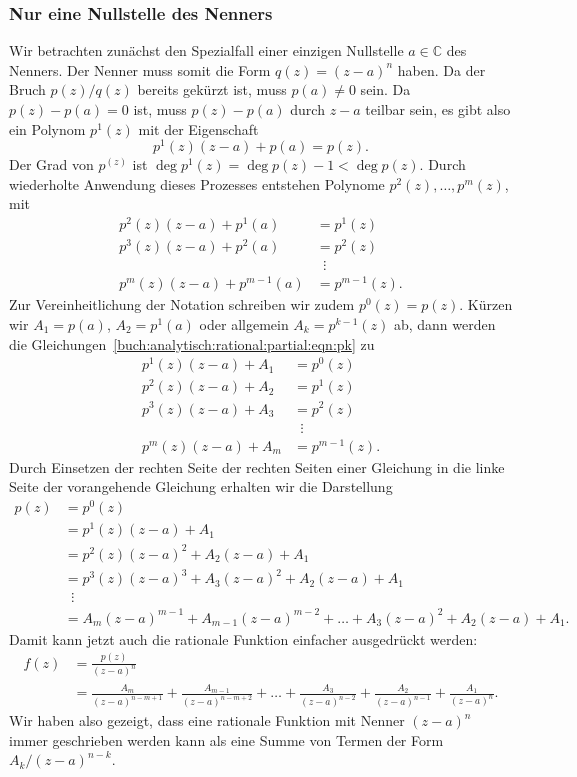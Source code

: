 %
%
\subsubsection{Nur eine Nullstelle des Nenners}
Wir betrachten zunächst den Spezialfall einer einzigen Nullstelle
$ a\in\mathbb{C}$ des Nenners.
Der Nenner muss somit die Form $q(z) = (z- a)^n$ haben.
Da der Bruch $p(z)/q(z)$ bereits gekürzt ist, muss $p( a)\ne 0$
sein.
Da $p(z)-p( a)=0$ ist, muss $p(z)-p( a)$ durch $z- a$
teilbar sein, es gibt also ein Polynom $p^1(z)$ mit der Eigenschaft
\[
p^1(z)(z- a) + p( a) = p(z).
\]
Der Grad von $p^(z)$ ist $\deg p^1(z) = \deg p(z)-1 < \deg p(z)$.
Durch wiederholte Anwendung dieses Prozesses entstehen Polynome
$p^2(z),\dots,p^m(z)$, mit 
\begin{equation}
\begin{aligned}
p^2(z)(z- a) + p^1( a)     &= p^1(z)           \\
p^3(z)(z- a) + p^2( a)     &= p^2(z)           \\[-2pt]
                                   &\phantom{a} \vdots \\
p^m(z)(z- a) + p^{m-1}( a) &= p^{m-1}(z).
\end{aligned}
\label{buch:analytisch:rational:partial:eqn:pk}
\end{equation}
Zur Vereinheitlichung der Notation schreiben wir zudem $p^0(z)=p(z)$.
Kürzen wir $A_1=p( a)$, $A_2=p^1( a)$ oder allgemein
$A_k = p^{k-1}(z)$ ab, dann werden die
Gleichungen~\eqref{buch:analytisch:rational:partial:eqn:pk}
zu
\[
\begin{aligned}
p^1(z)(z- a) + A_1 &= p^0(z)           \\
p^2(z)(z- a) + A_2 &= p^1(z)           \\
p^3(z)(z- a) + A_3 &= p^2(z)           \\[-2pt]
                       &\phantom{a} \vdots \\
p^m(z)(z- a) + A_m &= p^{m-1}(z).
\end{aligned}
\]
Durch Einsetzen der rechten Seite der rechten Seiten einer Gleichung
in die linke Seite der vorangehende Gleichung erhalten wir die
Darstellung
\begin{align*}
p(z)
&=
p^0(z)
\\
&=
p^1(z)(z- a) + A_1
\\
&=
p^2(z)(z- a)^2 + A_2(z- a) + A_1
\\
&=
p^3(z)(z- a)^3 + A_3 (z- a)^2 + A_2 (z- a) + A_1
\\[-2pt]
&\phantom{a}\vdots
\\
&=
A_m(z-a)^{m-1} + A_{m-1}(z- a)^{m-2} + \ldots + A_3 (z- a)^2 + A_2(z- a) + A_1.
\end{align*}
Damit kann jetzt auch die rationale Funktion einfacher ausgedrückt
werden:
\begin{align*}
f(z)
&=
\frac{p(z)}{(z- a)^n}
\\
&=
\frac{A_m}{(z- a)^{n-m+1}}
+
\frac{A_{m-1}}{(z- a)^{n-m+2}}
+
\ldots
+
\frac{A_3}{(z- a)^{n-2}}
+
\frac{A_2}{(z- a)^{n-1}}
+
\frac{A_1}{(z- a)^n}.
\end{align*}
Wir haben also gezeigt, dass eine rationale Funktion mit Nenner
$(z- a)^n$ immer geschrieben werden kann als eine Summe
von Termen der Form $A_k/(z- a)^{n-k}$.

